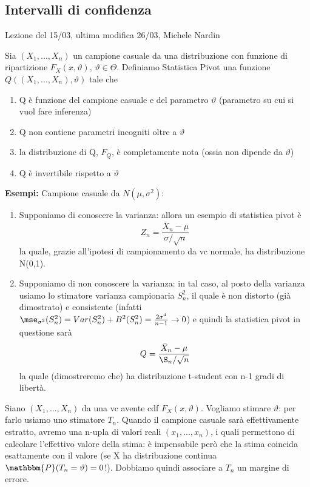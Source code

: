 
\subsection{Intervalli di confidenza}
Lezione del 15/03, ultima modifica 26/03, Michele Nardin

\begin{definizione}
Sia $(X_1,...,X_n)$ un campione casuale da una distribuzione con funzione di ripartizione $F_X (x,\vartheta)$, $\vartheta \in \Theta$. 
Definiamo Statistica Pivot una funzione $Q((X_1,...,X_n),\vartheta)$ tale che
\begin{enumerate}
\item Q è funzione del campione casuale e del parametro $\vartheta$ (parametro su cui si vuol fare inferenza)
\item Q non contiene parametri incogniti oltre a $\vartheta$
\item la distribuzione di Q, $F_Q$, è completamente nota (ossia non dipende da $\vartheta$)
\item Q è invertibile rispetto a $\vartheta$
\end{enumerate}
\end{definizione}

\textbf{Esempi:}
Campione casuale da $N(\mu,\sigma^2)$:
\begin{enumerate}
\item Supponiamo di conoscere la varianza: allora un esempio di statistica pivot è $$Z_n=\frac{\bar{X}_n - \mu}{\sigma / \sqrt{n}} $$ la quale, grazie all'ipotesi di campionamento da vc normale, ha distribuzione N(0,1).
\item Supponiamo di non conoscere la varianza: in tal caso, al posto della varianza usiamo lo stimatore varianza campionaria $S_n^2$, il quale è non distorto (già dimostrato) e consistente (infatti $\mse_{\sigma^2}(S_n^2)=Var(S_n^2) + B^2(S_n^2)=\frac{2\sigma^4}{n-1} \rightarrow 0$) e quindi la statistica pivot in questione sarà $$Q=\frac{\bar{X}_n - \mu}{\S_n / \sqrt{n}}$$ la quale (dimostreremo che) ha distribuzione t-student con n-1 gradi di libertà.
\end{enumerate}

Siano $(X_1,...,X_n)$ da una vc avente cdf $F_X(x,\vartheta)$. Vogliamo stimare $\vartheta$: per farlo usiamo uno stimatore $T_n$.
Quando il campione casuale sarà effettivamente estratto, avremo una n-upla di valori reali $(x_1,...,x_n)$, i quali permettono di calcolare l'effettivo valore della stima: è impensabile però che la stima coincida esattamente con il valore (se X ha distribuzione continua $\mathbbm{P}(T_n=\vartheta)=0$!). Dobbiamo quindi associare a $T_n$ un margine di errore.


